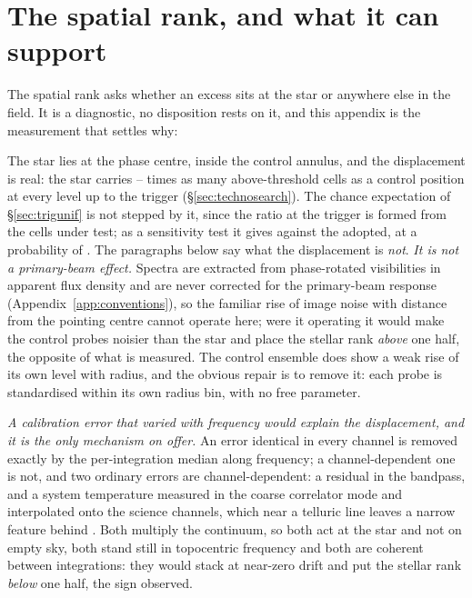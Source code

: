 \section{The spatial rank, and what it can support}
\label{app:radius}

The spatial rank asks whether an excess sits at the star or anywhere else in
the field. It is a diagnostic, no disposition rests on it, and this appendix
is the measurement that settles why: \rankstatus{}

The star lies at the phase centre, inside the control annulus, and the
displacement is real: the star carries \CkRatioLo--\CkRatioHi{} times as many
above-threshold cells as a control position at every level up to the trigger
(\S\ref{sec:technosearch}). The chance expectation of \S\ref{sec:trigunif} is
not stepped by it, since the ratio at the trigger is formed from the cells
under test; as a sensitivity test it gives \CeExpX{} against the \CeExp{}
adopted, at a probability of \CeProbStep. The paragraphs below say what the displacement is \emph{not}.
\emph{It is not a primary-beam effect.} Spectra are
extracted from phase-rotated visibilities in apparent flux density and are never
corrected for the primary-beam response (Appendix~\ref{app:conventions}), so
the familiar rise of image noise with distance from the pointing centre
cannot operate here; were it operating it would make the control probes
noisier than the star and place the stellar rank \emph{above} one half, the
opposite of what is measured. The control ensemble does show
a weak rise of its own level with radius, and the obvious repair is to remove it:
each probe is standardised within its own radius bin, with no free parameter.

\emph{A calibration error that varied with frequency would explain the
displacement, and it is the only mechanism on offer.} An error identical in
every channel is removed exactly by the per-integration median along
frequency; a channel-dependent one is not, and two ordinary errors are
channel-dependent: a residual in the bandpass, and a system temperature
measured in the coarse correlator mode and interpolated onto the science
channels, which near a telluric line leaves a narrow feature behind
\citep{ALMATsys2018}. Both
multiply the continuum, so both act at the star and not on empty sky, both
stand still in topocentric frequency and both are coherent between
integrations: they would stack at near-zero drift and put the stellar rank
\emph{below} one half, the sign observed.

